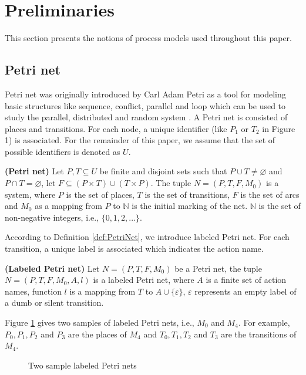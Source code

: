 \documentclass{llncs}
\begin{document}
\section{Preliminaries}\label{Preliminaries}
This section presents the notions of process models used throughout this paper.
\subsection{Petri net}
Petri net was originally introduced by Carl Adam Petri \cite{petri1962kommunikation} as a tool for modeling basic structures like sequence, conflict, parallel and loop which can be used to study the parallel, distributed and random system \cite{murata1989petri}.
A Petri net is consisted of places and transitions. For each node, a unique identifier (like $P_{1}$ or $T_{2}$ in Figure 1) is associated. For the remainder of this paper, we assume that the set of possible identifiers is denoted as $U$.

\begin{definition}\textbf{(Petri net)}
\label{def:PetriNet}
Let $P, T\subseteq U$ be finite and disjoint sets such that $P\cup T \neq \varnothing$ and $P\cap T=\varnothing$, let $F\subseteq (P\times T)\cup(T\times P)$. The tuple $N = (P,T,F,M_{0})$ is a system, where $P$ is the set of places, $T$ is the set of transitions, $F$ is the set of arcs and $M_{0}$ as a mapping from $P$ to $\mathbb{N}$ is the initial marking of the net. $\mathbb{N}$ is the set of non-negative integers, i.e., $\{0,1,2,...\}$.
\end{definition}

According to Definition \ref{def:PetriNet}, we introduce labeled Petri net. For each transition, a unique label is associated which  indicates the action name.

\begin{definition}\textbf{(Labeled Petri net)}
Let $N=(P,T,F,M_{0})$ be a Petri net, the tuple $N=(P,T,F,M_{0},A,l)$ is a labeled Petri net, where $A$ is a finite set of action names, function $l$ is a mapping from $T$ to $A \cup \{\varepsilon\}$, $\varepsilon$ represents an empty label of a dumb or silent transition. 
\end{definition}
Figure \ref{exPetri} gives two samples of labeled Petri nets, i.e., $M_{0}$ and $M_{4}$. For example, $P_{0},P_{1},P_{2}$ and $P_{3}$ are the places of $M_{4}$ and $T_{0},T_{1},T_{2}$ and $T_{3}$ are the transitions of $M_{4}$.
\begin{figure}[!htb]
\centering
{}
\caption{Two sample labeled Petri nets\label{exPetri}}
\end{figure}
\end{document}
